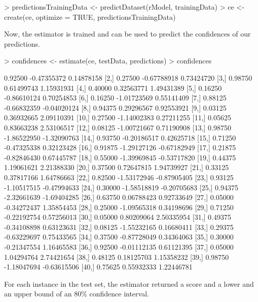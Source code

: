 \documentclass{article}
\begin{document}
\begin{Schunk}
\begin{Sinput}
> predictionsTrainingData <- predictDataset(rModel, trainingData)
> ce <- create(ce, optimize = TRUE, predictionsTrainingData)
\end{Sinput}
\end{Schunk}

Now, the estimator is trained and can be used to predict
the confidences of our predictions.

\begin{Schunk}
\begin{Sinput}
> confidences <- estimate(ce, testData, predictions)
> confidences
\end{Sinput}
\begin{Soutput}
         [,1]        [,2]        [,3]
 [1,] 0.92500 -0.47355372  0.14878158
 [2,] 0.27500 -0.67788918  0.73424720
 [3,] 0.98750  0.61499743  1.15931931
 [4,] 0.40000  0.32563771  1.49431389
 [5,] 0.16250 -0.86610124  0.70254853
 [6,] 0.16250 -1.01723569  0.55141409
 [7,] 0.88125 -0.66832359 -0.04020124
 [8,] 0.94375  0.29296567  0.92553921
 [9,] 0.03125  0.36932665  2.09110391
[10,] 0.27500 -1.14002383  0.27211255
[11,] 0.05625  0.83663238  2.53106517
[12,] 0.08125 -1.00721667  0.71190908
[13,] 0.98750 -1.86522950 -1.32090763
[14,] 0.93750 -0.20186517  0.42625718
[15,] 0.71250 -0.47325338  0.32123428
[16,] 0.91875 -1.29127126 -0.67182949
[17,] 0.21875 -0.82846430  0.67445787
[18,] 0.55000 -1.39969845 -0.53717820
[19,] 0.44375  1.19061621  2.21388330
[20,] 0.37500  0.72647815  1.94739927
[21,] 0.33125  0.37817166  1.64786663
[22,] 0.82500 -1.53172946 -0.87905405
[23,] 0.93125 -1.10517515 -0.47994633
[24,] 0.30000 -1.58518819 -0.20705683
[25,] 0.94375 -2.32661639 -1.69404285
[26,] 0.63750  0.06788423  0.92733649
[27,] 0.05000 -0.34272437  1.35854453
[28,] 0.25000 -1.09565318  0.34198696
[29,] 0.71250 -0.22192754  0.57256013
[30,] 0.05000  0.80209064  2.50335954
[31,] 0.49375 -0.34108898  0.63123631
[32,] 0.08125 -1.55232165  0.16680411
[33,] 0.29375 -0.63229697  0.75433565
[34,] 0.37500 -0.87728049  0.34364063
[35,] 0.30000 -0.21347554  1.16465583
[36,] 0.92500 -0.01112135  0.61121395
[37,] 0.05000  1.04294764  2.74421654
[38,] 0.48125  0.18125703  1.15358232
[39,] 0.98750 -1.18047694 -0.63615506
[40,] 0.75625  0.55932333  1.22446781
\end{Soutput}
\end{Schunk}

For each instance in the test set, the estimator returned
a score and a lower and an upper bound of an $80\%$
confidence interval.
\end{document}
